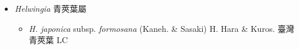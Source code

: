 
  \begin{itemize}
 \item[] \textit{Helwingia} 青莢葉屬
                                
  \begin{itemize}
        \item[] \textit{H. japonica} subsp. \textit{formosana} (Kaneh. \& Sasaki) H. Hara \& Kuros.  臺灣青莢葉   LC
  \end{itemize}
  \end{itemize}
